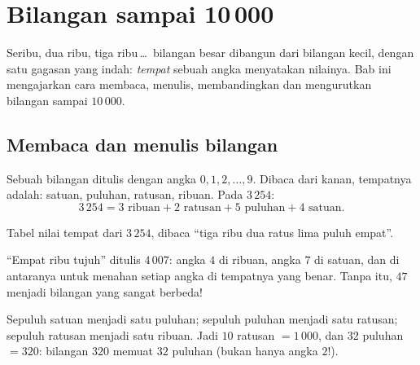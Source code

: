 \chapter{Bilangan sampai 10\,000}\label{ch:g3:numbers}

Seribu, dua ribu, tiga ribu\,\dots\ bilangan besar dibangun dari
bilangan kecil, dengan satu gagasan yang indah: \emph{tempat} sebuah
angka menyatakan nilainya. Bab ini mengajarkan cara membaca, menulis,
membandingkan dan mengurutkan bilangan sampai $10\,000$.

\section{Membaca dan menulis bilangan}

\begin{definition}\label{def:g3:numbers:place}
Sebuah bilangan ditulis dengan angka $0, 1, 2, \dots, 9$. Dibaca dari
kanan, tempatnya adalah: satuan, puluhan, ratusan, ribuan. Pada
$3\,254$:
\[
3\,254 = 3 \text{ ribuan} + 2 \text{ ratusan} + 5 \text{ puluhan}
+ 4 \text{ satuan}.
\]
\end{definition}

\begin{omfigure}

{\small Tabel nilai tempat dari $3\,254$, dibaca ``tiga ribu dua
ratus lima puluh empat''.}
\end{omfigure}

\begin{example}\label{ex:g3:numbers:zero}
``Empat ribu tujuh'' ditulis $4\,007$: angka $4$ di ribuan, angka
$7$ di satuan, dan \emph{} di antaranya untuk menahan setiap
angka di tempatnya yang benar. Tanpa  itu, $47$ menjadi bilangan
yang sangat berbeda!
\end{example}

\begin{example}[Menukar]\label{ex:g3:numbers:exchange}
Sepuluh satuan menjadi satu puluhan; sepuluh puluhan menjadi satu
ratusan; sepuluh ratusan menjadi satu ribuan. Jadi $10$ ratusan
$= 1\,000$, dan $32$ puluhan $= 320$: bilangan $320$ memuat $32$
puluhan (bukan hanya angka $2$!).
\end{example}

